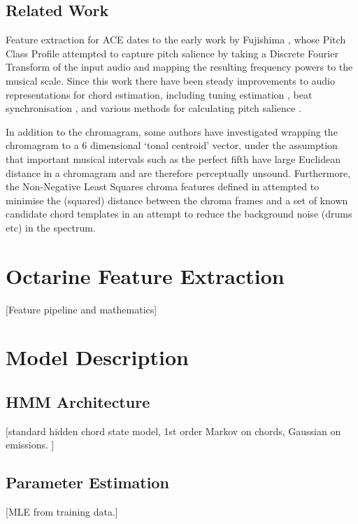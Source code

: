 \documentclass{article}
\begin{document}
\subsection{Related Work}
Feature extraction for ACE dates to the early work by Fujishima \cite{fujishima1999realtime}, whose Pitch Class Profile attempted to capture pitch salience by taking a Discrete Fourier Transform of the input audio and mapping the resulting frequency powers to the musical scale. Since this work there have been steady improvements to audio representations for chord estimation, including tuning estimation \cite{sheh2003chord}, beat synchronisation \cite{bello2005robust}, and various methods for calculating pitch salience \cite{pauws2004musical,6155600}.

In addition to the chromagram, some authors \cite{harte2006detecting} have investigated wrapping the chromagram to a 6 dimensional `tonal centroid' vector, under the assumption that important musical intervals such as the perfect fifth have large Euclidean distance in a chromagram and are therefore perceptually unsound. Furthermore, the Non-Negative Least Squares chroma features defined in \cite{mauch2010approximate} attempted to minimise the (squared) distance between the chroma frames and a set of known candidate chord templates in an attempt to reduce the background noise (drums etc) in the spectrum. 

\section{Octarine Feature Extraction}\label{sec:features}
[Feature pipeline and mathematics]

\section{Model Description}\label{sec:model}
\subsection{HMM Architecture}\label{sub:hmm}
[standard hidden chord state model, 1st order Markov on chords, Gaussian on emissions. ]

\subsection{Parameter Estimation}\label{sub:params}
[MLE from training data.]
\end{document}
